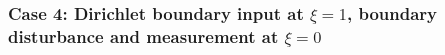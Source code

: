 \documentclass[11pt, a4paper]{amsart}
\theoremstyle{definition}
\numberwithin{equation}{section}
\newcommand{\wdist}{w_{\mbox{\scriptsize\textit{dist}}}}
\begin{document}

\subsubsection*{Case 4: Dirichlet boundary input at $\xi=1$, boundary disturbance and measurement at $\xi = 0$}
\label{sec:Heat1D3}
~\\[-1ex]
\end{document}
